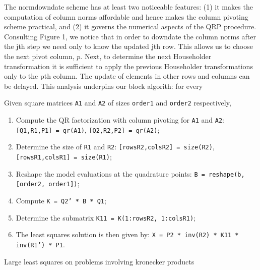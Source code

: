 \documentclass[final]{siamart0216}
\begin{document}
The normdowndate scheme has at least two noticeable features: (1) it makes the computation of column norms affordable and hence makes the column pivoting scheme practical, and (2) it governs the numerical aspects of the QRP procedure. Consulting Figure 1, we notice that in order to downdate the column norms after the jth step we need only to know the updated jth row. This allows us to choose the next pivot column, $p$. Next, to determine the next Householder transformation it is sufficient to apply the previous Householder transformations only to the pth column. The update of elements in other rows and columns can be delayed. This analysis underpins our block algorith: for every 
\begin{algorithm}
Given square matrices \texttt{A1} and \texttt{A2} of sizes \texttt{order1} and \texttt{order2} respectively,
\begin{enumerate}
\itemsep0em
\item Compute the QR factorization with column pivoting for \texttt{A1} and \texttt{A2}: \texttt{[Q1,R1,P1] = qr(A1)},  \texttt{[Q2,R2,P2] = qr(A2)};
\item Determine the size of \texttt{R1} and \texttt{R2}: \texttt{[rowsR2,colsR2] = size(R2)}, \texttt{[rowsR1,colsR1] = size(R1)};
\item Reshape the model evaluations at the quadrature points: \texttt{B = reshape(b, [order2, order1])};
\item Compute \texttt{K = Q2' * B * Q1};
\item Determine the submatrix \texttt{K11 = K(1:rowsR2, 1:colsR1)};
\item The least squares solution is then given by: \texttt{X = P2 * inv(R2) * K11 * inv(R1') * P1}.
\end{enumerate}
\caption{Large least squares on problems involving kronecker products}
\label{alg:0}
\end{algorithm}





\end{document}

